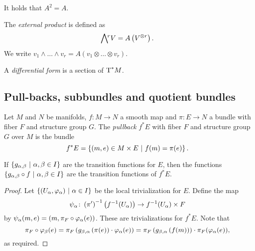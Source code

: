\begin{opomba}
It holds that $A^2 = A$.
\end{opomba}

\begin{definicija}
The \emph{external product} is defined as
\[
\bigwedge\!^{\!r} V = A \left(V^{\otimes r}\right).
\]
We write
$v_1 \wedge \dots \wedge v_r = A(v_1 \otimes \dots \otimes v_r)$.
\end{definicija}


\begin{definicija}
A \emph{differential form} is a section of
$\operatorname{T}^*\!M$.
\end{definicija}



\newpage

\subsection{Pull-backs, subbundles and quotient bundles}

\begin{definicija}
Let $M$ and $N$ be manifolds, $f \colon M \to N$ a smooth map and
$\pi \colon E \to N$ a bundle with fiber $F$ and structure group
$G$. The \emph{pullback} $f^*E$ with fiber $F$ and
structure group $G$ over $M$ is the bundle
\[
f^*E = \left\{(m, e) \in M \times E~\middle\vert~f(m) = \pi(e)\right\}.
\]
\end{definicija}

\begin{trditev}
If $\left\{g_{\alpha, \beta}~\middle\vert~\alpha, \beta \in I\right\}$ are the
transition functions for $E$, then the functions
$\left\{g_{\alpha, \beta} \circ f~\middle\vert~\alpha, \beta \in I\right\}$ are the
transition functions of $f^*E$.
\end{trditev}

\begin{proof}
Let $\left\{(U_\alpha, \varphi_\alpha)~\middle\vert~\alpha \in I\right\}$ be the local
trivialization for $E$. Define the map
\[
\psi_\alpha \colon 
\left(\pi'\right)^{-1} \left(f^{-1}(U_\alpha)\right) \to f^{-1}(U_\alpha) \times F
\]
by $\psi_\alpha(m, e) = \left(m, \pi_F \circ \varphi_\alpha(e)\right)$.
These are trivializations for $f^*E$. Note that
\[
\pi_F \circ \varphi_\beta(e) =
\pi_F \left(g_{\beta, \alpha} \left(\pi(e)\right) \cdot \varphi_\alpha(e)\right) =
\pi_F \left(g_{\beta, \alpha} \left(f(m)\right)\right) \cdot
\pi_F(\varphi_\alpha(e)),
\]
as required.
\end{proof}

